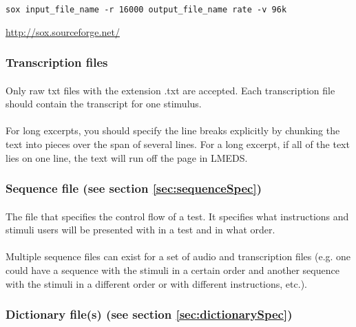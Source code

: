 \begin{lstlisting}
sox input_file_name -r 16000 output_file_name rate -v 96k
\end{lstlisting}

\url{http://sox.sourceforge.net/}

\subsubsection{Transcription files}

\paragraph{}
Only raw txt files with the extension .txt are accepted.  Each transcription file should contain the transcript for one stimulus.

\paragraph{}
For long excerpts, you should specify the line breaks explicitly by chunking the text into pieces over the span of several lines.  For a long excerpt, if all of the text lies on one line, the text will run off the page in LMEDS.

\subsubsection{Sequence file (see section \ref{sec:sequenceSpec})}

\paragraph{}
The file that specifies the control flow of a test.  It specifies what instructions and stimuli users will be presented with in a test and in what order. 

\paragraph{}
Multiple sequence files can exist for a set of audio and transcription files (e.g. one could have a sequence with the stimuli in a certain order and another sequence with the stimuli in a different order or with different instructions, etc.).

\subsubsection{Dictionary file(s) (see section \ref{sec:dictionarySpec})}

